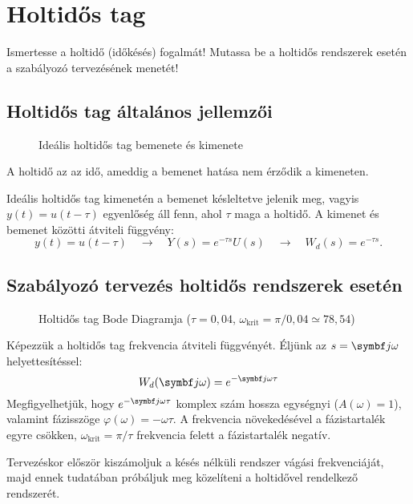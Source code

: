 \section{Holtidős tag}

\begin{about}
  Ismertesse a holtidő (időkésés) fogalmát! Mutassa be a holtidős rendszerek
  esetén a szabályozó tervezésének menetét!
\end{about}

\subsection{Holtidős tag általános jellemzői}

\begin{figure}[htb]
  \centering
  
  \caption{Ideális holtidős tag bemenete és kimenete}
  \label{fig:delay}
\end{figure}

A holtidő az az idő, ameddig a bemenet hatása nem érződik a kimeneten.

Ideális holtidős tag kimenetén a bemenet késleltetve jelenik meg, vagyis
$y(t) = u(t - \tau)$ egyenlőség áll fenn, ahol $\tau$ maga a holtidő. A kimenet
és bemenet közötti átviteli függvény:
\begin{equation}
  y(t) = u(t - \tau)
  \quad \rightarrow \quad
  Y(s) = e^{-\tau s} U(s)
  \quad \rightarrow \quad
  W_d(s) = e^{-\tau s}
  .
  \label{eq:delay-W}
\end{equation}

\subsection{Szabályozó tervezés holtidős rendszerek esetén}

\begin{figure}[htb]
  \centering
  \hspace{-4cm}
  
  \caption{
    Holtidős tag Bode Diagramja
    ($\tau=0,04$, $\omega_\text{krit} = \pi / 0,04 \simeq 78,54$)
  }
  \label{fig:delay-bode}
\end{figure}

Képezzük a holtidős tag frekvencia átviteli függvényét. Éljünk az
$s = \iu \omega$ helyettesítéssel:
\begin{equation}
  W_d(\iu\omega) = e^{-\iu\omega\tau}
  \label{eq:delay-iuw}
\end{equation}
Megfigyelhetjük, hogy $e^{-\iu\omega\tau}$ komplex szám hossza egységnyi
($A(\omega) = 1$), valamint fázisszöge $\varphi(\omega) = -\omega\tau$.
A frekvencia növekedésével a fázistartalék egyre csökken, $\omega_\text{krit} =
  \pi / \tau$ frekvencia felett a fázistartalék negatív.

Tervezéskor először kiszámoljuk a késés nélküli rendszer vágási frekvenciáját,
majd ennek tudatában próbáljuk meg közelíteni a holtidővel rendelkező
rendszerét.

